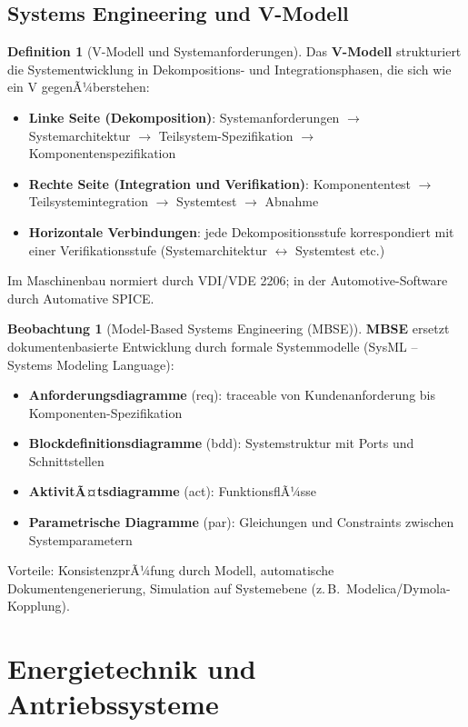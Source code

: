 ﻿\documentclass[a4paper,12pt]{report}
\theoremstyle{definition}
\newtheorem{definition}{Definition}
\newtheorem{beobachtung}{Beobachtung}
\begin{document}
\section{Systems Engineering und V-Modell}

\begin{definition}[V-Modell und Systemanforderungen]
Das \textbf{V-Modell} strukturiert die Systementwicklung in Dekompositions-
und Integrationsphasen, die sich wie ein V gegenÃ¼berstehen:
\begin{itemize}
    \item[-] \textbf{Linke Seite (Dekomposition)}: Systemanforderungen
          $\to$ Systemarchitektur $\to$ Teilsystem-Spezifikation $\to$ Komponentenspezifikation
    \item[-] \textbf{Rechte Seite (Integration und Verifikation)}: Komponententest
          $\to$ Teilsystemintegration $\to$ Systemtest $\to$ Abnahme
    \item[-] \textbf{Horizontale Verbindungen}: jede Dekompositionsstufe
          korrespondiert mit einer Verifikationsstufe
          (Systemarchitektur $\leftrightarrow$ Systemtest etc.)
\end{itemize}
Im Maschinenbau normiert durch VDI/VDE 2206;
in der Automotive-Software durch Automative SPICE.
\end{definition}

\begin{beobachtung}[Model-Based Systems Engineering (MBSE)]
\textbf{MBSE} ersetzt dokumentenbasierte Entwicklung durch
formale Systemmodelle (SysML -- Systems Modeling Language):
\begin{itemize}
    \item[-] \textbf{Anforderungsdiagramme} (req): traceable von Kundenanforderung
          bis Komponenten-Spezifikation
    \item[-] \textbf{Blockdefinitionsdiagramme} (bdd): Systemstruktur mit
          Ports und Schnittstellen
    \item[-] \textbf{AktivitÃ¤tsdiagramme} (act): FunktionsflÃ¼sse
    \item[-] \textbf{Parametrische Diagramme} (par): Gleichungen und
          Constraints zwischen Systemparametern
\end{itemize}
Vorteile: KonsistenzprÃ¼fung durch Modell, automatische Dokumentengenerierung,
Simulation auf Systemebene (z.\,B.\ Modelica/Dymola-Kopplung).
\end{beobachtung}

\chapter{Energietechnik und Antriebssysteme}
\end{document}
